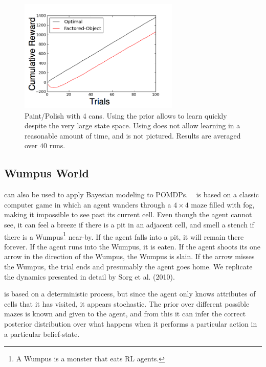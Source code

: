 
\begin{figure}
\vskip 0.2in
\begin{center}
\centerline{\includegraphics[width=3in]{paint4can}}
\caption{
Paint/Polish with 4 cans. Using the  prior allows  to learn quickly despite the very large state space. Using  does not allow learning in a reasonable amount of time, and is not pictured. Results are averaged over $40$ runs.
}
\label{fig:paint4can}
\end{center}
\vskip -0.2in
\end{figure} 


\subsection{Wumpus World}

 can also be used to apply Bayesian modeling to POMDPs. ~\cite{russell94} is based on a classic computer game in which an agent wanders through a $4\times 4$ maze filled with fog, making it impossible to see past its current cell. Even though the agent cannot see, it can feel a breeze if there is a pit in an adjacent cell, and smell a stench if there is a Wumpus\footnote{A Wumpus is a monster that eats RL agents.} near-by. If the agent falls into a pit, it will remain there forever. If the agent runs into the Wumpus, it is eaten. If the agent shoots its one arrow in the direction of the Wumpus, the Wumpus is slain. If the arrow misses the Wumpus, the trial ends and presumably the agent goes home. We replicate the dynamics presented in detail by Sorg et al. (2010). %

 is based on a deterministic process, but since the agent only knows attributes of cells that it has visited, it appears stochastic. The prior over different possible mazes is known and given to the agent, and from this it can infer the correct posterior distribution over what happens when it performs a particular action in a particular belief-state.

